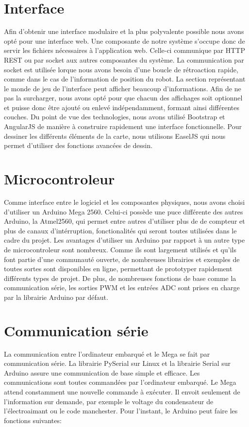 \section{Interface}
Afin d'obtenir une interface modulaire et la plus polyvalente possible nous avons opté pour une interface web.
Une composante de notre système s'occupe donc de servir les fichiers nécessaires à l'application web.
Celle-ci communique par HTTP REST ou par socket aux autres composantes du système.
La communication par socket est utilisée lorque nous avons besoin d'une boucle de rétroaction rapide,
comme dans le cas de l'information de position du robot.
La section représentant le monde de jeu de l'interface peut afficher beaucoup d'informations.
Afin de ne pas la surcharger, nous avons opté pour que chacun des affichages soit optionnel et puisse donc
être ajouté ou enlevé indépendamment, formant ainsi différentes couches.
Du point de vue des technologies, nous avons utilisé Bootstrap et AngularJS de manière à construire rapidement une interface fonctionnelle.
Pour dessiner les différents éléments de la carte, nous utilisons EaselJS qui nous permet d'utiliser des fonctions avancées de dessin.


\section{Microcontroleur}

Comme interface entre le logiciel et les composantes physiques, nous avons choisi d’utiliser un Arduino Mega 2560. Celui-ci possède une puce différente des autres Arduino, la Atmel2560,
qui permet entre autres d’utiliser plus de de compteur et plus de canaux d’intérruption, fonctionalités qui seront toutes utilisées dans le cadre du projet. Les avantages d’utiliser un Arduino par
rapport à un autre type de microcontroleur sont nombreux. Comme ils sont largement utilisés et qu’ils font partie d’une communauté ouverte, de nombreuses librairies et exemples de toutes sortes sont
disponibles en ligne, permettant de prototyper rapidement différents types de projet. De plus, de nombreuses fonctions de base comme la communication série, les sorties PWM et les entrées ADC sont
prises en charge par la librairie Arduino par défaut.

\section{Communication série}

La communication entre l’ordinateur embarqué et le Mega se fait par communication série.
La librairie PySerial sur Linux et la librairie Serial sur Arduino assure une communication de base simple et efficace. Les communications sont toutes commandées par l’ordinateur embarqué.
Le Mega attend constamment une nouvelle commande à exécuter. Il envoit seulement de l’information sur demande, par exemple le voltage du condensateur de l’électroaimant ou le code manchester.
Pour l’instant, le Arduino peut faire les fonctions suivantes:

